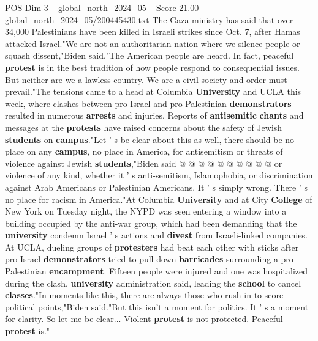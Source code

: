 \begin{textsample}{POS Dim 3 – global\_north\_2024\_05 – Score 21.00 – global\_north\_2024\_05/200445430.txt}
The Gaza ministry has said that over 34,000 Palestinians have been killed in Israeli strikes since Oct. 7, after Hamas attacked Israel."We are not an authoritarian nation where we silence people or squash dissent,"Biden said."The American people are heard.
In fact, peaceful \textbf{protest} is in the best tradition of how people respond to consequential issues.
But neither are we a lawless country.
We are a civil society and order must prevail."The tensions came to a head at Columbia \textbf{University} and UCLA this week, where clashes between pro-Israel and pro-Palestinian \textbf{demonstrators} resulted in numerous \textbf{arrests} and injuries.
Reports of \textbf{antisemitic} \textbf{chants} and messages at the \textbf{protests} have raised concerns about the safety of Jewish \textbf{students} on \textbf{campus}."Let ' s be clear about this as well, there should be no place on any \textbf{campus}, no place in America, for antisemitism or threats of violence against Jewish \textbf{students},"Biden said @ @ @ @ @ @ @ @ @ @ or violence of any kind, whether it ' s anti-semitism, Islamophobia, or discrimination against Arab Americans or Palestinian Americans.
It ' s simply wrong.
There ' s no place for racism in America."At Columbia \textbf{University} and at City \textbf{College} of New York on Tuesday night, the NYPD was seen entering a window into a building occupied by the anti-war group, which had been demanding that the \textbf{university} condemn Israel ' s actions and \textbf{divest} from Israeli-linked companies.
At UCLA, dueling groups of \textbf{protesters} had beat each other with sticks after pro-Israel \textbf{demonstrators} tried to pull down \textbf{barricades} surrounding a pro-Palestinian \textbf{encampment}.
Fifteen people were injured and one was hospitalized during the clash, \textbf{university} administration said, leading the \textbf{school} to cancel \textbf{classes}."In moments like this, there are always those who rush in to score political points,"Biden said."But this isn't a moment for politics.
It ' s a moment for clarity.
So let me be clear...
Violent \textbf{protest} is not protected.
Peaceful \textbf{protest} is."

\end{textsample}
